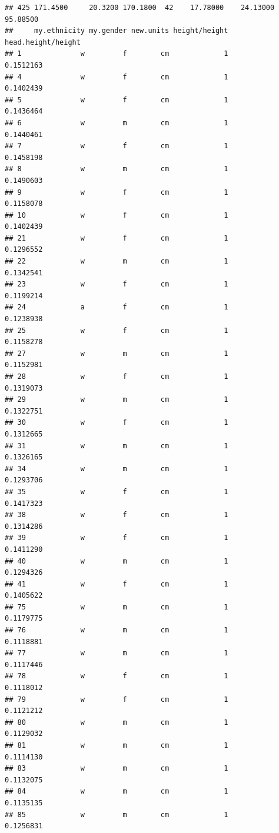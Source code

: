 \documentclass[]{article}
\begin{document}
\begin{verbatim}
## 425 171.4500     20.3200 170.1800  42    17.78000    24.13000  95.88500
##     my.ethnicity my.gender new.units height/height head.height/height
## 1              w         f        cm             1          0.1512163
## 4              w         f        cm             1          0.1402439
## 5              w         f        cm             1          0.1436464
## 6              w         m        cm             1          0.1440461
## 7              w         f        cm             1          0.1458198
## 8              w         m        cm             1          0.1490603
## 9              w         f        cm             1          0.1158078
## 10             w         f        cm             1          0.1402439
## 21             w         f        cm             1          0.1296552
## 22             w         m        cm             1          0.1342541
## 23             w         f        cm             1          0.1199214
## 24             a         f        cm             1          0.1238938
## 25             w         f        cm             1          0.1158278
## 27             w         m        cm             1          0.1152981
## 28             w         f        cm             1          0.1319073
## 29             w         m        cm             1          0.1322751
## 30             w         f        cm             1          0.1312665
## 31             w         m        cm             1          0.1326165
## 34             w         m        cm             1          0.1293706
## 35             w         f        cm             1          0.1417323
## 38             w         f        cm             1          0.1314286
## 39             w         f        cm             1          0.1411290
## 40             w         m        cm             1          0.1294326
## 41             w         f        cm             1          0.1405622
## 75             w         m        cm             1          0.1179775
## 76             w         m        cm             1          0.1118881
## 77             w         m        cm             1          0.1117446
## 78             w         f        cm             1          0.1118012
## 79             w         f        cm             1          0.1121212
## 80             w         m        cm             1          0.1129032
## 81             w         m        cm             1          0.1114130
## 83             w         m        cm             1          0.1132075
## 84             w         m        cm             1          0.1135135
## 85             w         m        cm             1          0.1256831

\end{verbatim}
\end{document}
